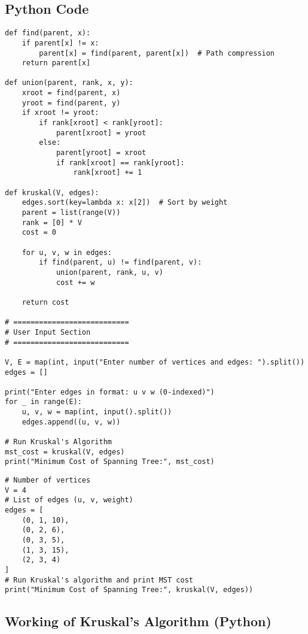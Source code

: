 \documentclass[14pt,a4paper]{extarticle}
\begin{document}
\subsection{Python Code}
\begin{lstlisting}[style=python, caption={Kruskal's Algorithm in Python}]
def find(parent, x):
    if parent[x] != x:
        parent[x] = find(parent, parent[x])  # Path compression
    return parent[x]

def union(parent, rank, x, y):
    xroot = find(parent, x)
    yroot = find(parent, y)
    if xroot != yroot:
        if rank[xroot] < rank[yroot]:
            parent[xroot] = yroot
        else:
            parent[yroot] = xroot
            if rank[xroot] == rank[yroot]:
                rank[xroot] += 1

def kruskal(V, edges):
    edges.sort(key=lambda x: x[2])  # Sort by weight
    parent = list(range(V))
    rank = [0] * V
    cost = 0

    for u, v, w in edges:
        if find(parent, u) != find(parent, v):
            union(parent, rank, u, v)
            cost += w

    return cost

# ===========================
# User Input Section
# ===========================

V, E = map(int, input("Enter number of vertices and edges: ").split())
edges = []

print("Enter edges in format: u v w (0-indexed)")
for _ in range(E):
    u, v, w = map(int, input().split())
    edges.append((u, v, w))

# Run Kruskal's Algorithm
mst_cost = kruskal(V, edges)
print("Minimum Cost of Spanning Tree:", mst_cost)
\end{lstlisting}

\begin{verbatim}
# Number of vertices
V = 4
# List of edges (u, v, weight)
edges = [
    (0, 1, 10),
    (0, 2, 6),
    (0, 3, 5),
    (1, 3, 15),
    (2, 3, 4)
]
# Run Kruskal's algorithm and print MST cost
print("Minimum Cost of Spanning Tree:", kruskal(V, edges))

\end{verbatim}


\subsection{Working of Kruskal's Algorithm (Python)}
\end{document}
